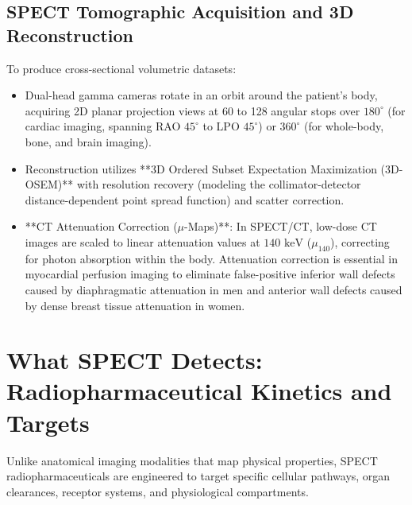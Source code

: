 \documentclass[11pt,a4paper]{article}
\begin{document}
\subsection{SPECT Tomographic Acquisition and 3D Reconstruction}
To produce cross-sectional volumetric datasets:
\begin{itemize}
    \item Dual-head gamma cameras rotate in an orbit around the patient's body, acquiring 2D planar projection views at 60 to 128 angular stops over $180^\circ$ (for cardiac imaging, spanning RAO $45^\circ$ to LPO $45^\circ$) or $360^\circ$ (for whole-body, bone, and brain imaging).
    \item Reconstruction utilizes **3D Ordered Subset Expectation Maximization (3D-OSEM)** with resolution recovery (modeling the collimator-detector distance-dependent point spread function) and scatter correction.
    \item **CT Attenuation Correction ($\mu$-Maps)**: In SPECT/CT, low-dose CT images are scaled to linear attenuation values at $140\text{ keV}$ ($\mu_{140}$), correcting for photon absorption within the body. Attenuation correction is essential in myocardial perfusion imaging to eliminate false-positive inferior wall defects caused by diaphragmatic attenuation in men and anterior wall defects caused by dense breast tissue attenuation in women.
\end{itemize}

\section{What SPECT Detects: Radiopharmaceutical Kinetics and Targets}

Unlike anatomical imaging modalities that map physical properties, SPECT radiopharmaceuticals are engineered to target specific cellular pathways, organ clearances, receptor systems, and physiological compartments.
\end{document}
